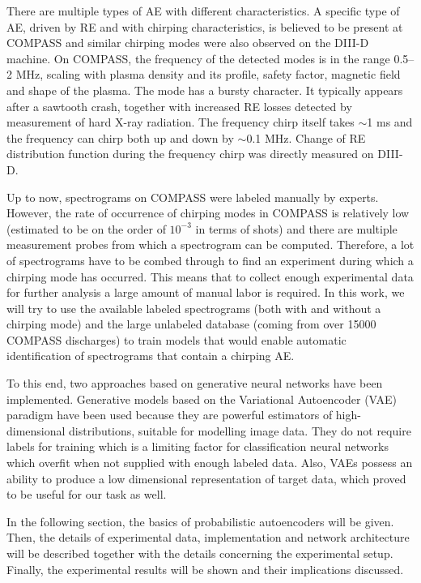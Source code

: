 There are multiple types of AE with different characteristics. A specific type of AE, driven by RE and with chirping characteristics, is believed to be present at COMPASS\cite{markovic2015alfven, melnikov2015quasicoherent, markovic2017alfven} and similar chirping modes were also observed on the DIII-D machine\cite{lvovskiy2019observation}. On COMPASS\cite{panek2015status}, the frequency of the detected modes is in the range 0.5--2 MHz, scaling with plasma density and its profile, safety factor, magnetic field and shape of the plasma\cite{markovic2017alfven}. The mode has a bursty character. It typically appears after a sawtooth crash, together with increased RE losses detected by measurement of hard X-ray radiation\cite{markovic2017alfven}. The frequency chirp itself takes $\sim$1 ms and the frequency can chirp both up and down by $\sim$0.1 MHz. Change of RE distribution function during the frequency chirp was directly measured on DIII-D\cite{lvovskiy2019observation}.   

Up to now, spectrograms on COMPASS were labeled manually by experts. However, the rate of occurrence of chirping modes in COMPASS is relatively low (estimated to be on the order of $10^{-3}$ in terms of shots) and there are multiple measurement probes from which a spectrogram can be computed. Therefore, a lot of spectrograms have to be combed through to find an experiment during which a chirping mode has occurred. This means that to collect enough experimental data for further analysis a large amount of manual labor is required. In this work, we will try to use the available labeled spectrograms (both with and without a chirping mode) and the large unlabeled database (coming from over 15000 COMPASS discharges) to train models that would enable automatic identification of spectrograms that contain a chirping AE.

To this end, two approaches based on generative neural networks have been implemented. Generative models based on the Variational Autoencoder (VAE) paradigm\cite{kingma2013vae} have been used because they are powerful estimators of high-dimensional distributions, suitable for modelling image data. They do not require labels for training which is a limiting factor for classification neural networks which overfit when not supplied with enough labeled data. Also, VAEs possess an ability to produce a low dimensional representation of target data, which proved to be useful for our task as well. 

In the following section, the basics of probabilistic autoencoders will be given. Then, the details of experimental data, implementation and network architecture will be described together with the details concerning the experimental setup. Finally, the experimental results will be shown and their implications discussed.

